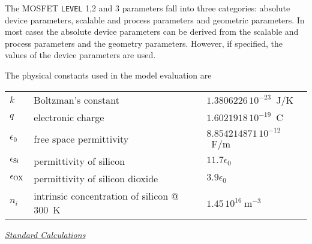 The MOSFET {\tt LEVEL} 1,2 and 3 parameters fall into three categories: absolute
device parameters, scalable and process parameters and geometric parameters.
In most cases the absolute device parameters can be derived from the scalable
and process
parameters and the geometry parameters.   However, if specified, the values
of the device parameters are used.

The physical constants used in the model evaluation are
\begin{center}
\begin{tabular}{|l|l|l|}
\hline
$k$ & Boltzman's constant           &  $1.3806226\,10^{-23}$~J/K\\
$q$ & electronic charge             & $1.6021918\,10^{-19}$~C\\
$\epsilon_0$& free space permittivity &  $8.854214871\,10^{-12}$~F/m\\
$\epsilon_{\mbox{\scriptsize Si}}$& permittivity of silicon &  $11.7 \epsilon_0$\\
$\epsilon_{\mbox{\scriptsize OX}}$& permittivity of silicon dioxide &  $3.9 \epsilon_0$\\
$n_i$&intrinsic concentration of silicon @ 300~K& $1.45\,10^{16}~\mbox{m}^{-3}$\\
\hline
\end{tabular}
\end{center}

\noindent\underline{\sl \large Standard Calculations}\\[0.1in]

